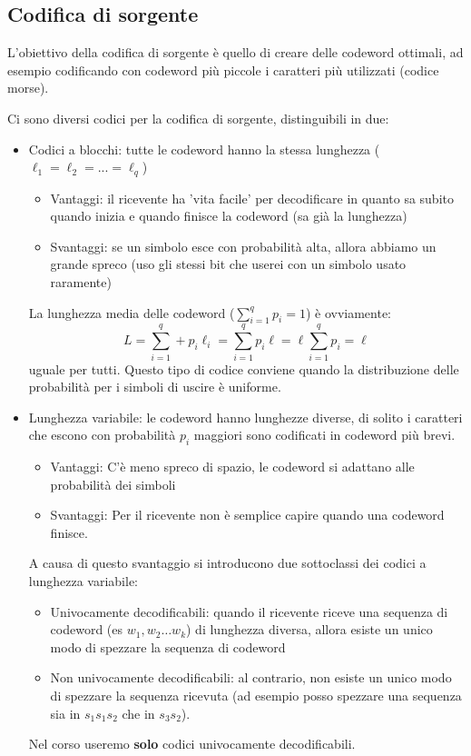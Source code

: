 \subsection*{Codifica di sorgente}

L'obiettivo della codifica di sorgente è quello di creare delle codeword ottimali, ad esempio codificando con codeword più piccole i caratteri più utilizzati (codice morse).

Ci sono diversi codici per la codifica di sorgente, distinguibili in due:
\begin{itemize}
	\item Codici a blocchi: tutte le codeword hanno la stessa lunghezza ($\ell_1 = \ell_2 = ... = \ell_q$)
	\begin{itemize}
		\item Vantaggi: il ricevente ha 'vita facile' per decodificare in quanto sa subito quando inizia e quando finisce la codeword (sa già la lunghezza)
		\item Svantaggi: se un simbolo esce con probabilità alta, allora abbiamo un grande spreco (uso gli stessi bit che userei con un simbolo usato raramente)
	\end{itemize}
La lunghezza media delle codeword ($\sum_{i=1}^qp_i = 1$) è ovviamente:
\begin{equation}
L=\sum_{i=1}^q+p_i\ell_i = \sum_{i=1}^qp_i\ell = \ell \sum_{i=1}^qp_i = \ell
\end{equation}
uguale per tutti.
Questo tipo di codice conviene quando la distribuzione delle probabilità per i simboli di uscire è uniforme.
\item Lunghezza variabile: le codeword hanno lunghezze diverse, di solito i caratteri che escono con probabilità $p_i$ maggiori sono codificati in codeword più brevi. 
\begin{itemize}
	\item Vantaggi: C'è meno spreco di spazio, le codeword si adattano alle probabilità dei simboli
	\item Svantaggi: Per il ricevente non è semplice capire quando una codeword finisce.
\end{itemize}
A causa di questo svantaggio si introducono due sottoclassi dei codici a lunghezza variabile:
\begin{itemize}
	\item Univocamente decodificabili: quando il ricevente riceve una sequenza di codeword (es $w_1, w_2 \dots w_k$) di lunghezza diversa, allora esiste un unico modo di spezzare la sequenza di codeword
	\item Non univocamente decodificabili: al contrario, non esiste un unico modo di spezzare la sequenza ricevuta (ad esempio posso spezzare una sequenza sia in $s_1s_1s_2$ che in $s_3s_2$).
\end{itemize}
Nel corso useremo \textbf{solo} codici univocamente decodificabili.
\end{itemize}









